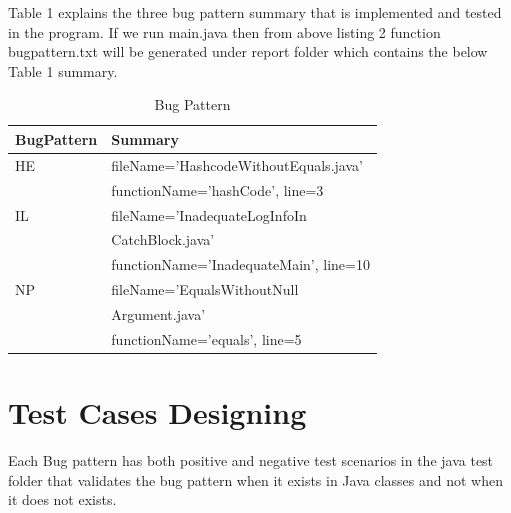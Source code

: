 \documentclass[sigplan,screen]{acmart}
\begin{document}
Table 1 explains the three bug pattern summary that is implemented and tested in the program. If we run main.java then from above listing 2 function bugpattern.txt will be generated under report folder which contains the below Table 1 summary.
\begin{table}[H]
  \caption{Bug Pattern}
  \label{tab}
  \begin{tabular}{ll}
    \toprule
    BugPattern &Summary\\
    \midrule
    \toprule
    HE & fileName='HashcodeWithoutEquals.java'\\
    &functionName='hashCode', line=3\\
    \midrule
    IL & fileName='InadequateLogInfoIn\\
    &CatchBlock.java'\\ 
    &functionName='InadequateMain', line=10\\
    \midrule
    NP & fileName='EqualsWithoutNull\\
    &Argument.java'\\ 
    &functionName='equals', line=5\\
  \bottomrule
\end{tabular}
\end{table}

\section{Test Cases Designing}

Each Bug pattern has both positive and negative test scenarios in the java test folder that validates the bug pattern when it exists in Java classes and not when it does not exists. 
\end{document}
